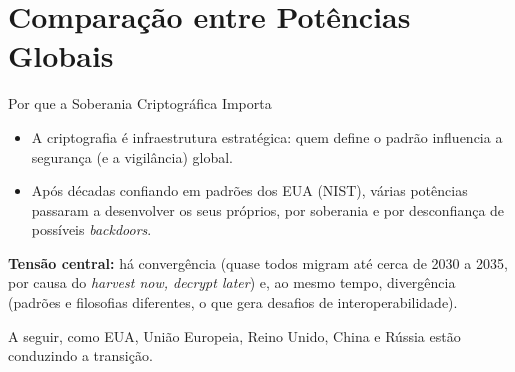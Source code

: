 \documentclass{beamer}
\begin{document}
\section{Comparação entre Potências Globais}

\begin{frame}{Por que a Soberania Criptográfica Importa}
    \begin{itemize}
        \footnotesize
        \item A criptografia é infraestrutura estratégica: quem define o padrão influencia a segurança (e a vigilância) global.
        \item Após décadas confiando em padrões dos EUA (NIST), várias potências passaram a desenvolver os seus próprios, por soberania e por desconfiança de possíveis \textit{backdoors}.
    \end{itemize}
    \medskip
    \begin{tcolorbox}[colback=blue!5,colframe=blue!50!black,boxrule=0.5pt]
        \footnotesize
        \textbf{Tensão central:} há convergência (quase todos migram até cerca de 2030 a 2035, por causa do \textit{harvest now, decrypt later}) e, ao mesmo tempo, divergência (padrões e filosofias diferentes, o que gera desafios de interoperabilidade).
    \end{tcolorbox}
    \medskip
    {\footnotesize A seguir, como EUA, União Europeia, Reino Unido, China e Rússia estão conduzindo a transição.}
\end{frame}
\end{document}
